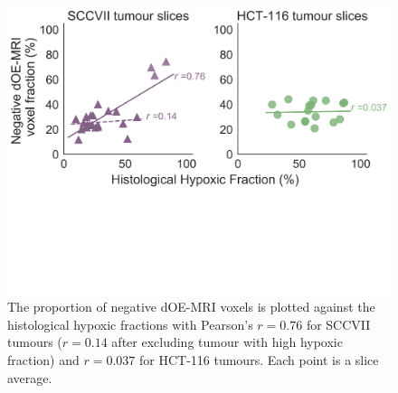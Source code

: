 \begin{figure}[htbp]
   \includegraphics[width=\textwidth]{oemri_thesis2/oemri_thesis2-images/histocorrel3.pdf} %
   \caption{The proportion of negative \ac{dOE-MRI} voxels is plotted against the histological hypoxic fractions with Pearson's $r=0.76$ for SCCVII tumours ($r=0.14$ after excluding tumour with high hypoxic fraction) and $r=0.037$ for HCT-116 tumours. Each point is a slice average.
   \label{histo_correlations}}
\end{figure}

